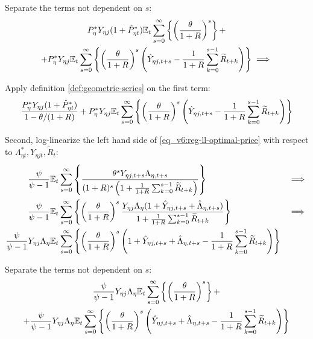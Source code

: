 \documentclass[../thesis.tex]{subfiles}
\begin{document}
Separate the terms not dependent on $s$:
\begin{multline}
	P_{\eta}^{\ast} Y_{\eta j} ( 1 + \hat{P}_{\eta t}^{\ast} ) {\mathbb{E}_{t}} \sum_{s=0}^{\infty} \left\{ \left( \frac{\theta}{1 + R} \right)^s \right\} + \\
	+ P_{\eta}^{\ast} Y_{\eta j} {\mathbb{E}_{t}} \sum_{s=0}^{\infty} \left\{ \left( \frac{\theta}{1 + R} \right)^s \left( \hat{Y}_{\eta j, t+s} - \frac{1}{1 + R} \sum_{k=0}^{s-1} \widetilde{R}_{t+k} \right) \right\} \implies \nonumber
\end{multline}

Apply definition \ref{def:geometric-series} on the first term:
\begin{align}
	\frac{ P_{\eta}^{\ast} Y_{\eta j} ( 1 + \hat{P}_{\eta t}^{\ast} )}{1-\theta /(1+R)} + P_{\eta}^{\ast} Y_{\eta j} {\mathbb{E}_{t}} \sum_{s=0}^{\infty} \left\{ \left( \frac{\theta}{1 + R} \right)^s \left( \hat{Y}_{\eta j, t+s} - \frac{1}{1 + R} \sum_{k=0}^{s-1} \widetilde{R}_{t+k} \right) \right\} \nonumber
\end{align}

Second, log-linearize the left hand side of \ref{eq_v6:reg-ll-optimal-price} with respect to \( \Lambda_{\eta t}^{\ast}, Y_{\eta j t}, \widetilde{R}_t \):
\begin{alignat}{2}
	\frac{\psi}{\psi-1} &{\mathbb{E}_{t}} \sum_{s=0}^{\infty} \left\{ \frac{\theta^s Y_{\eta j,t+s} \Lambda_{\eta, t+s}}{ (1 + R)^s \left( 1 + \frac{1}{1 + R} \sum_{k=0}^{s-1} \widetilde{R}_{t+k} \right)} \right\} & \implies \nonumber \\
	\frac{\psi}{\psi-1} &{\mathbb{E}_{t}} \sum_{s=0}^{\infty} \left\{ \left( \frac{\theta}{1 + R} \right)^s \frac{ Y_{\eta j} \Lambda_{\eta} (1+ \hat{Y}_{\eta j, t+s} + \hat{\Lambda}_{\eta, t+s})}{ 1 + \frac{1}{1 + R} \sum_{k=0}^{s-1} \widetilde{R}_{t+k}} \right\} & \implies \nonumber \\
	\frac{\psi}{\psi-1} Y_{\eta j} \Lambda_{\eta} &{\mathbb{E}_{t}} \sum_{s=0}^{\infty} \left\{ \left( \frac{\theta}{1 + R} \right)^s \left( 1+ \hat{Y}_{\eta j, t+s} + \hat{\Lambda}_{\eta, t+s} - \frac{1}{1 + R} \sum_{k=0}^{s-1} \widetilde{R}_{t+k} \right) \right\} & \nonumber
\end{alignat}

Separate the terms not dependent on $s$:
\begin{multline}
	\frac{\psi}{\psi-1} Y_{\eta j} \Lambda_{\eta} {\mathbb{E}_{t}} \sum_{s=0}^{\infty} \left\{ \left( \frac{\theta}{1 + R} \right)^s \right\} + 
	\\
	+ \frac{\psi}{\psi-1} Y_{\eta j} \Lambda_{\eta} {\mathbb{E}_{t}} \sum_{s=0}^{\infty} \left\{ \left( \frac{\theta}{1 + R} \right)^s \left( \hat{Y}_{\eta j, t+s} + \hat{\Lambda}_{\eta, t+s} - \frac{1}{1 + R} \sum_{k=0}^{s-1} \widetilde{R}_{t+k} \right) \right\} \nonumber
\end{multline}
\end{document}
